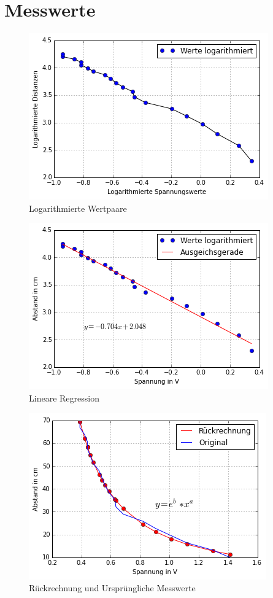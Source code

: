 \documentclass[12pt,oneside,a4paper]{report}
\begin{document}
\section{Messwerte}
\label{chap:VERSUCH_2_MESSWERTE}
\begin{figure}[H]
    \centering
	\includegraphics{media/LogaritmierteMessergebnisse.png}
	\caption{Logarithmierte Wertpaare}
	\label{img:LOGARITHMIERTE_WERTEPAARE}
\end{figure}

\begin{figure}[H]
    \centering
	\includegraphics{media/LineareRegression.png}
	\caption{Lineare Regression}
	\label{img:LINEARE_REGRESSION}
\end{figure}
\begin{figure}[H]
    \centering
	\includegraphics{media/vergleichOriginalLinreg.png}
	\caption{Rückrechnung und Ursprüngliche Messwerte}
	\label{img:RUECKRECHNUNG}
\end{figure}
\end{document}
